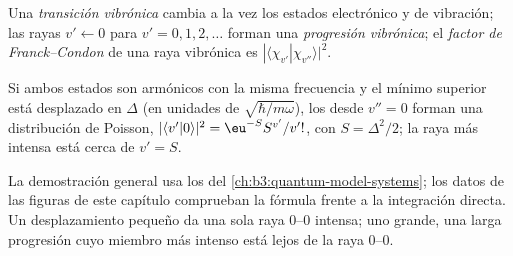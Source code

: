 \begin{definition}\label{def:b3:electronic-spectroscopy:vibronic}
Una \emph{transición vibrónica} cambia a la vez los estados
electrónico y de vibración; las rayas $v' \leftarrow 0$ para $v' = 0, 1, 2,
\dots$ forman una \emph{progresión vibrónica}; el
\emph{factor de Franck--Condon} de una raya vibrónica es
$|\langle\chi_{v'}|\chi_{v''}\rangle|^2$.
\end{definition}

\begin{proposition}\label{prop:b3:electronic-spectroscopy:displaced}
Si ambos estados son armónicos con la misma frecuencia y el mínimo superior está
desplazado en $\Delta$ (en unidades de $\sqrt{\hbar/m\omega}$), los 
desde $v'' = 0$ forman una distribución de Poisson,
$|\langle v'|0\rangle|^2 = \eu^{-S}S^{v'}/v'!$, con $S = \Delta^2/2$; la raya más intensa
está cerca de $v' = S$.
\end{proposition}
\admitted

La demostración general usa los  del
\cref{ch:b3:quantum-model-systems}; los datos de las figuras de este capítulo comprueban la
fórmula frente a la integración directa. Un desplazamiento pequeño da una sola raya 0--0
intensa; uno grande, una larga progresión cuyo miembro más intenso está lejos de
la raya 0--0.

